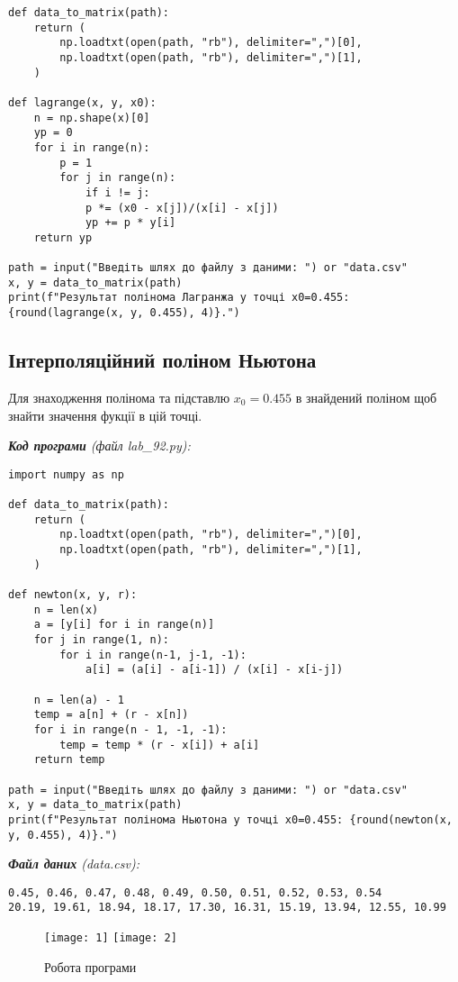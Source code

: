 \documentclass{article}
\newcommand\lab{9}
\begin{document}
\begin{large}
\begin{lstlisting}
def data_to_matrix(path):
	return (
		np.loadtxt(open(path, "rb"), delimiter=",")[0],
		np.loadtxt(open(path, "rb"), delimiter=",")[1],
	)

def lagrange(x, y, x0):
	n = np.shape(x)[0]
	yp = 0
	for i in range(n):
		p = 1
		for j in range(n):
			if i != j:
			p *= (x0 - x[j])/(x[i] - x[j])
			yp += p * y[i]    
	return yp

path = input("Введіть шлях до файлу з даними: ") or "data.csv"
x, y = data_to_matrix(path)
print(f"Результат полінома Лагранжа у точці x0=0.455: {round(lagrange(x, y, 0.455), 4)}.")\end{lstlisting}
		
		\subsection*{Інтерполяційний поліном Ньютона}
		
		Для знаходження полінома та підставлю $x_0=0.455$ в знайдений поліном щоб знайти значення фукції в цій точці.
		
		\noindent\textit{\textbf{Код програми} (файл lab\_\lab2.py):}
		\begin{lstlisting}
import numpy as np

def data_to_matrix(path):
	return (
		np.loadtxt(open(path, "rb"), delimiter=",")[0],
		np.loadtxt(open(path, "rb"), delimiter=",")[1],
	)

def newton(x, y, r):
	n = len(x)
	a = [y[i] for i in range(n)]
	for j in range(1, n):
		for i in range(n-1, j-1, -1):
			a[i] = (a[i] - a[i-1]) / (x[i] - x[i-j])
	
	n = len(a) - 1
	temp = a[n] + (r - x[n])
	for i in range(n - 1, -1, -1):
		temp = temp * (r - x[i]) + a[i]
	return temp

path = input("Введіть шлях до файлу з даними: ") or "data.csv"
x, y = data_to_matrix(path)
print(f"Результат полінома Ньютона у точці x0=0.455: {round(newton(x, y, 0.455), 4)}.")\end{lstlisting}
		
		\noindent\textit{\textbf{Файл даних} (data.csv):}
		\begin{lstlisting}
0.45, 0.46, 0.47, 0.48, 0.49, 0.50, 0.51, 0.52, 0.53, 0.54
20.19, 19.61, 18.94, 18.17, 17.30, 16.31, 15.19, 13.94, 12.55, 10.99\end{lstlisting}
		
		\begin{figure}[h!]
			\centering
			\texttt{[image: 1]}
			\texttt{[image: 2]}
			\caption{Робота програми}
		\end{figure}
		

\end{large}
\end{document}

